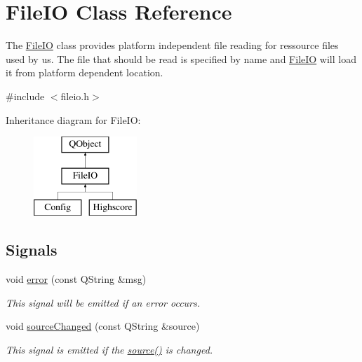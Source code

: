 \hypertarget{class_file_i_o}{\section{File\+I\+O Class Reference}
\label{class_file_i_o}
}


The \hyperlink{class_file_i_o}{File\+I\+O} class provides platform independent file reading for ressource files used by us.  The file that should be read is specified by name and \hyperlink{class_file_i_o}{File\+I\+O} will load it from platform dependent location.  




{\ttfamily \#include $<$fileio.\+h$>$}

Inheritance diagram for File\+I\+O\+:\begin{figure}[H]
\begin{center}
\leavevmode
\includegraphics[height=3.000000cm]{class_file_i_o}
\end{center}
\end{figure}
\subsection*{Signals}
\begin{DoxyCompactItemize}
\item 
void \hyperlink{class_file_i_o_a4136bb085d530f9dd54eb849f14d58da}{error} (const Q\+String \&msg)
\begin{DoxyCompactList}\small\item\em This signal will be emitted if an error occurs. \end{DoxyCompactList}\item 
void \hyperlink{class_file_i_o_a31a6e00e907268e4473a0a826d2e6a1e}{source\+Changed} (const Q\+String \&source)
\begin{DoxyCompactList}\small\item\em This signal is emitted if the \hyperlink{class_file_i_o_a8da2b4c6cd72af512e4556203c1c66e7}{source()} is changed. \end{DoxyCompactList}\end{DoxyCompactItemize}
